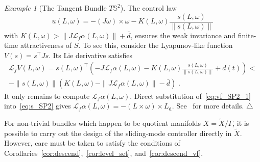 \documentclass{article}
\theoremstyle{definition}
\theoremstyle{remark}
\newtheorem{example}{Example}
\newcommand\xqed[1]{%
  \leavevmode\unskip\penalty9999 \hbox{}\nobreak\hfill
  \quad\hbox{#1}}
\newcommand\eexa{\xqed{$\triangle$}}
\newcommand{\lie}{\mathcal{L}}	%
\newcommand{\DI}{\tilde{X}}	%
\newcommand{\MA}{X}	%
\newcommand{\rd}{\mathrm{d}}	%
\newcommand{\SP}{\mathbb{S}}	%
\newcommand{\SW}{S}	%
\begin{document}
\begin{example}[The Tangent Bundle $T\SP^2$]
 The control law
 \begin{equation} \label{eq:u_TSP2}
  u(L,\omega) = -(J\omega) \times \omega - K(L,\omega)\frac{s(L,\omega) }{\| s(L,\omega) \|}
 \end{equation}
 with $K(L,\omega) > \|J\lie_f \alpha(L,\omega)\| + \bar{d}$, ensures the weak invariance and finite-time attractiveness of $\SW$.
 To see this, consider the Lyapunov-like function $V(s) = s^\top J s$. Its Lie derivative satisfies
 \begin{multline*}
  \lie_f V(L,\omega) = s(L,\omega)^\top \left(-J\lie_f \alpha(L,\omega) -
   K(L,\omega)\frac{s(L,\omega) }{\| s(L,\omega) \|} + d(t) \right) < \\
    -\| s(L,\omega) \|\left(K(L,\omega) - \|J\lie_f \alpha(L,\omega)\| -\bar{d}\right) \;.
 \end{multline*}
 It only remains to compute $\lie_f \alpha(L,\omega)$. Direct substitution of~\eqref{eq:vf_SP2_1} into~\eqref{eq:s_SP2} gives
 $\lie_f \alpha(L,\omega) = -(L\times \omega)\times L_\rd$. See~\cite{gomez2019} for more details.
 \eexa
\end{example}

For non-trivial bundles which happen to be quotient manifolds $\MA = \DI/\Gamma$, it is possible to carry out the design of the
sliding-mode controller directly in $\DI$. However, care must be taken to satisfy the conditions of
Corollaries~\ref{cor:descend},~\ref{cor:level_set}, and~\ref{cor:descend_vf}.
 
\end{document}
